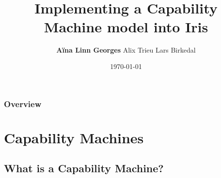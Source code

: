 \documentclass{beamer}
\title[Capability Machine in Iris]{Implementing a Capability Machine model into Iris} %
\author{\textbf{A\"{i}na Linn Georges} \hspace{1cm} Alix Trieu \hspace{1cm} Lars Birkedal} %
\institute[Aarhus University] %
{
Aarhus University \\ %
\medskip
\textit{ageorges@cs.au.dk} %
}
\date{\today} %
\begin{document}
\begin{frame}
\titlepage %
\end{frame}

\begin{frame}
\frametitle{Overview} %
\tableofcontents %
\end{frame}


\section{Capability Machines} %

\subsection{What is a Capability Machine?} 
\end{document}
